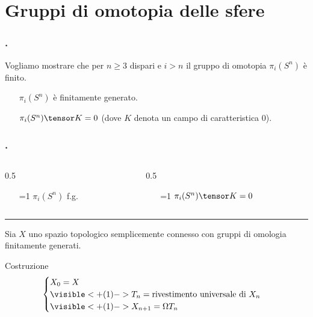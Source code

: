 \section{Gruppi di omotopia delle sfere}
\newcommand*{\sphereheader}[2]{%
\begin{columns}
\checklistsize
\begin{column}{0.5\textwidth}
\begin{itemize}
\item[\ifnum #1=1 \done\else\notdone\fi] \(\pi_i(S^n)\) f.g.
\end{itemize}
\end{column}
\begin{column}{0.5\textwidth}
\begin{itemize}
\item[\ifnum #2=1 \done\else\notdone\fi] \(\pi_i(S^n)\tensor K=0\)
\end{itemize}
\end{column}
\end{columns}
\rule{\textwidth}{0.4pt}
}
\newenvironment*{sphereframe}[3][]{%
\begin{frame}[t,#1]
\frametitle{.}
\sphereheader{#2}{#3}
\vfill
}{%
\vfill
\end{frame}
}
\begin{frame}
\frametitle{.}
Vogliamo mostrare che per \(n\ge 3\) dispari e \(i>n\) il gruppo di omotopia \(\pi_i(S^n)\) è finito.
\pause
\begin{itemize}[<+->]
\item[\notdone] \(\pi_i(S^n)\) è finitamente generato.
\item[\notdone] \(\pi_i(S^n)\tensor K=0\) (dove \(K\) denota un campo di caratteristica \(0\)).
\end{itemize}
\end{frame}
\begin{sphereframe}{0}{0}
Sia \(X\) uno spazio topologico semplicemente connesso con gruppi di omologia finitamente generati.
\pause
\begin{block}{Costruzione}
\[
\begin{cases}
X_0=X\\
\visible<+(1)->{T_n=\text{rivestimento universale di \(X_n\)}}\\
\visible<+(1)->{X_{n+1}=\Omega T_n}
\end{cases}
\]
\end{block}
\end{sphereframe}
